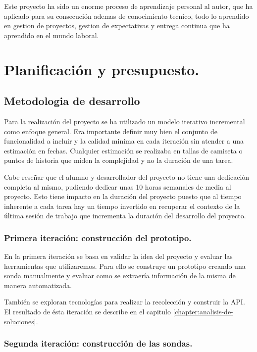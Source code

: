Este proyecto ha sido un enorme proceso de aprendizaje personal al autor, que ha aplicado para su consecución ademas de conocimiento tecnico, todo lo aprendido
en gestion de proyectos, gestion de expectativas y entrega continua que ha aprendido en el mundo laboral.


\chapter{Planificación y presupuesto.}
\section{Metodologia de desarrollo}

Para la realización del proyecto se ha utilizado un modelo iterativo incremental como enfoque general. Era importante definir
muy bien el conjunto de funcionalidad a incluir y la calidad minima en cada iteración sin atender a una estimación en fechas. 
Cualquier estimación se realizaba en tallas de camiseta o puntos de historia que miden la complejidad y no la duración de una tarea.

Cabe reseñar que el alumno y desarrollador del proyecto no tiene una dedicación completa al mismo, pudiendo dedicar unas 10 horas semanales
de media al proyecto. Esto tiene impacto en la duración del proyecto puesto que al tiempo inherente a cada tarea hay un tiempo
invertido en recuperar el contexto de la última sesión de trabajo que incrementa la duración del desarrollo del proyecto.


\subsection{Primera iteración: construcción del prototipo.}

En la primera iteración se basa en validar la idea del proyecto y evaluar las herramientas que utilizaremos. Para ello se construye
un prototipo creando una sonda manualmente y evaluar como se extraería información de la misma de manera automatizada.

También se exploran tecnologías para realizar la recolección y construir la API. El resultado de ésta iteración se describe en
el capitulo \ref{chapter:analisis-de-soluciones}.

\subsection{Segunda iteración: construcción de las sondas.}

